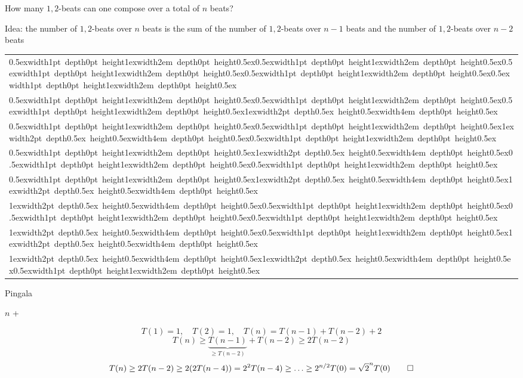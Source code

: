 \begin{example}
\label{ex:pingala}
How many $1,2$-beats can one compose over a total of $n$ beats?

Idea: the number of $1,2$-beats over $n$ beats is the sum of the number of $1,2$-beats over $n-1$ beats and the number of $1,2$-beats over $n-2$ beats
\def\TA{\raise0.5ex\hbox{\vrule width1pt depth0pt height1ex\vrule width2em depth0pt height0.5ex}}
\def\TAA{\raise1ex\hbox{\color{gray}\vrule width2pt depth0.5ex height0.5ex\vrule width4em depth0pt height0.5ex}}
\begin{center}
    \vspace{0em}
    \begin{tabular}[b]{l}
        \TA\hspace{1em}\TA\TA\TA\TA \\
        \TA\hspace{1em}\TA\TA\TAA \\
        \TA\hspace{1em}\TA\TAA\TA \\
        \TA\hspace{1em}\TAA\TA\TA \\
        \TA\hspace{1em}\TAA\TAA \\
    
        \TAA\hspace{1em}\TA\TA\TA \\
        \TAA\hspace{1em}\TA\TAA \\
        \TAA\hspace{1em}\TAA\TA \\
      \end{tabular}
\end{center}
\begin{algorithm}[htb] %
    \caption{Pingala}
    \begin{algorithmic}[1]
     
            \State \Return $n$
        \EndIf
        \State \Return {} + 
    \EndFunction
    \end{algorithmic}
\end{algorithm}


\vspace{-0.1em}
\[
T(1) = 1, \quad T(2) = 1, \quad T(n) = T(n-1) + T(n-2) + 2
\]
\[
 T(n) \geq \underbrace{T(n-1)}_{\geq T(n-2)} + T(n-2)  \geq 2T(n-2)
\]
\[
T(n) \geq 2T(n-2) \geq 2(2T(n-4)) = 2^2T(n-4) \geq \ldots \geq 2^{n/2}T(0) = \sqrt{2}^n T(0)  
\qedhere
\]
\end{example}


